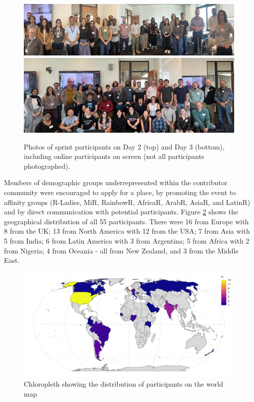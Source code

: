 \begin{figure}
\includegraphics[width=1\linewidth]{images/group_thursday} \includegraphics[width=1\linewidth]{images/group_friday} \caption{Photos of sprint participants on Day 2 (top) and Day 3 (bottom), including online participants on screen (not all participants photographed).}\label{fig:photos}
\end{figure}

Members of demographic groups underrepresented within the contributor community
were encouraged to apply for a place, by promoting the event to affinity groups (R-Ladies, MiR, RainbowR, AfricaR, ArabR, AsiaR, and LatinR) and by direct
communication with potential participants. Figure \ref{fig:map} shows the
geographical distribution of all 55 participants. There were 16 from Europe with 8 from the UK; 13 from North America with 12 from the USA;
7 from Asia with 5 from India; 6 from Latin America with 3 from Argentina; 5 from Africa with 2 from Nigeria; 4 from Oceania - all from New Zealand, and 3 from the Middle East.

\begin{figure}
\includegraphics[width=1\linewidth]{figures/participant_map} \caption{Chloropleth showing the distribution of participants on the world map}\label{fig:map}
\end{figure}

